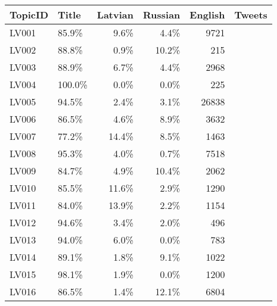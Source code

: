 \begin{tabular}{llrrrr}
\toprule
TopicID  & Title &  Latvian & Russian & English &  Tweets \\
\midrule
LV001    &  85.9\% &  9.6\% &  4.4\% &   9721 \\
LV002    &  88.8\% &  0.9\% & 10.2\% &    215 \\
LV003    &  88.9\% &  6.7\% &  4.4\% &   2968 \\
LV004    & 100.0\% &  0.0\% &  0.0\% &    225 \\
LV005    &  94.5\% &  2.4\% &  3.1\% &  26838 \\
LV006    &  86.5\% &  4.6\% &  8.9\% &   3632 \\
LV007    &  77.2\% & 14.4\% &  8.5\% &   1463 \\
LV008    &  95.3\% &  4.0\% &  0.7\% &   7518 \\
LV009    &  84.7\% &  4.9\% & 10.4\% &   2062 \\
LV010    &  85.5\% & 11.6\% &  2.9\% &   1290 \\
LV011    &  84.0\% & 13.9\% &  2.2\% &   1154 \\
LV012    &  94.6\% &  3.4\% &  2.0\% &    496 \\
LV013    &  94.0\% &  6.0\% &  0.0\% &    783 \\
LV014    &  89.1\% &  1.8\% &  9.1\% &   1022 \\
LV015    &  98.1\% &  1.9\% &  0.0\% &   1200 \\
LV016    &  86.5\% &  1.4\% & 12.1\% &   6804 \\
\bottomrule
\end{tabular}
